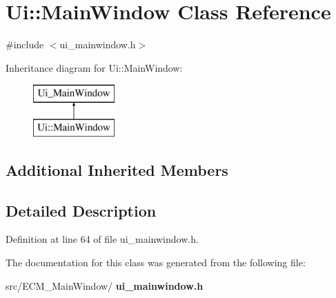 \section{Ui\+:\+:Main\+Window Class Reference}
\label{class_ui_1_1_main_window}


{\ttfamily \#include $<$ui\+\_\+mainwindow.\+h$>$}

Inheritance diagram for Ui\+:\+:Main\+Window\+:\begin{figure}[H]
\begin{center}
\leavevmode
\includegraphics[height=2.000000cm]{d4/d4a/class_ui_1_1_main_window}
\end{center}
\end{figure}
\subsection*{Additional Inherited Members}


\subsection{Detailed Description}


Definition at line 64 of file ui\+\_\+mainwindow.\+h.



The documentation for this class was generated from the following file\+:\begin{DoxyCompactItemize}
\item 
src/\+E\+C\+M\+\_\+\+Main\+Window/\textbf{ ui\+\_\+mainwindow.\+h}\end{DoxyCompactItemize}
